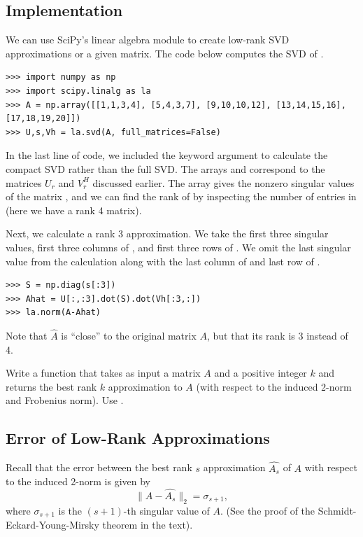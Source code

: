 \subsection*{Implementation}
We can use SciPy's linear algebra module to create low-rank SVD approximations or a given matrix.
The code below computes the SVD of .
\begin{lstlisting}
>>> import numpy as np
>>> import scipy.linalg as la
>>> A = np.array([[1,1,3,4], [5,4,3,7], [9,10,10,12], [13,14,15,16], [17,18,19,20]])
>>> U,s,Vh = la.svd(A, full_matrices=False)
\end{lstlisting}
In the last line of code, we included the keyword argument  to calculate the
compact SVD rather than the full SVD. The arrays  and  correspond to the matrices
$U_r$ and $V_r^H$ discussed earlier. The array  gives the nonzero singular values
of the matrix , and we can find the rank of  by inspecting the number of entries in  (here we have a rank 4 matrix). 

Next, we calculate a rank 3 approximation.
We take the first three singular values, first three columns of , and first three rows of .
We omit the last singular value from the calculation along with the last column of  and last row of .

\begin{lstlisting}
>>> S = np.diag(s[:3])
>>> Ahat = U[:,:3].dot(S).dot(Vh[:3,:])
>>> la.norm(A-Ahat)
\end{lstlisting}
Note that $\widehat A$ is ``close'' to the original matrix $A$, but that its rank is 3 instead of 4. 

\begin{problem}
Write a function  that takes as input a matrix $A$ and a positive integer $k$ and returns 
the best rank $k$ approximation to $A$ (with respect to the induced 2-norm and Frobenius norm).
Use .
\label{prob:svd_approx}
\end{problem}

\subsection*{Error of Low-Rank Approximations}

Recall that the error between the best rank $s$ approximation $\widehat{A_s}$ of $A$ with respect to the induced 2-norm is given by
$$
\|A - \widehat{A_s}\|_2 = \sigma_{s+1},
$$
where $\sigma_{s+1}$ is the $(s+1)$-th singular value of $A$. 
(See the proof of the Schmidt-Eckard-Young-Mirsky theorem in the text).

